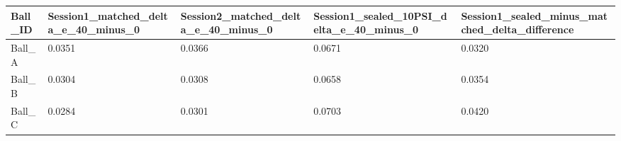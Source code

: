 \begin{tabular}{lllll}
\hline
Ball\_ID & Session1\_matched\_delta\_e\_40\_minus\_0 & Session2\_matched\_delta\_e\_40\_minus\_0 & Session1\_sealed\_10PSI\_delta\_e\_40\_minus\_0 & Session1\_sealed\_minus\_matched\_delta\_difference \\
\hline
Ball\_A & 0.0351 & 0.0366 & 0.0671 & 0.0320 \\
Ball\_B & 0.0304 & 0.0308 & 0.0658 & 0.0354 \\
Ball\_C & 0.0284 & 0.0301 & 0.0703 & 0.0420 \\
\hline
\end{tabular}
